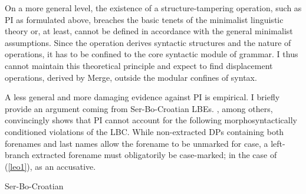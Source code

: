 \documentclass[output=paper]{langsci/langscibook}
\begin{document}
On a more general level, the existence of a stru\-cture-tampering operation,
such as \gls{PI} as formulated above, breaches the basic tenets of the
minimalist linguistic theory or, at least, cannot be defined in  accordance
with the general minimalist assumptions. Since the  operation derives
syntactic structures and the nature of  operations, it has to be
confined to the core syntactic module of grammar. I thus cannot maintain this
theoretical principle and expect to find displacement operations, derived by
Merge, outside the modular confines of syntax.

A less general and more damaging evidence against \gls{PI} is empirical. I
briefly provide an argument coming from Ser-Bo-Croatian
\glspl{LBE}. \cite{Boskovic:2009b}, among others, convincingly shows that
\gls{PI} cannot account for the following morphosyntactically conditioned
violations of the \gls{LBC}. While non-extracted DPs containing both forenames
and last names allow the forename to be unmarked for case, a left-branch
extracted forename must obligatorily be case-marked;
in the case of (\ref{leo1}), as an accusative.

\begin{exe}
\ex Ser-Bo-Croatian
\begin{xlista}
\ex
\begin{xlisti}


\end{xlisti}

\ex
\begin{xlisti}

\end{xlisti}

\end{xlista}
	\label{leo1}
\end{exe}
\end{document}

